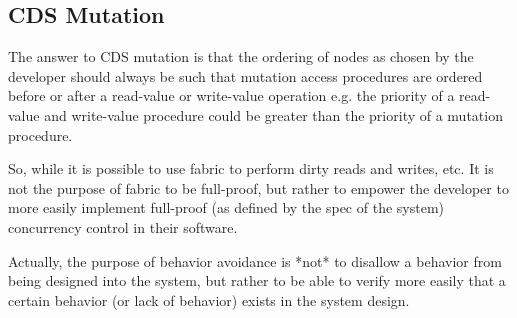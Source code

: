 \subsection{CDS Mutation}

The answer to CDS mutation is that the ordering of nodes as chosen by the developer should always be such that mutation access procedures are ordered before or after a read-value or write-value operation e.g. the priority of a read-value and write-value procedure could be greater than the priority of a mutation procedure.

So, while it is possible to use fabric to perform dirty reads and writes, etc. It is not the purpose of fabric to be full-proof, but rather to empower the developer to more easily implement full-proof (as defined by the spec of the system) concurrency control in their software.

Actually, the purpose of behavior avoidance is *not* to disallow a behavior from being designed into the system, but rather to be able to verify more easily that a certain behavior (or lack of behavior) exists in the system design.